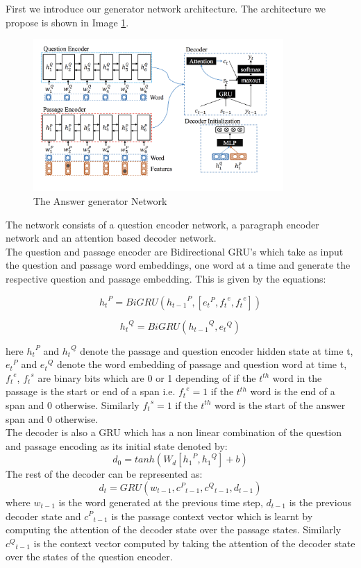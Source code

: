 First we introduce our generator network architecture. The architecture we propose is shown in Image \ref{im:im_gen}.
\begin{figure}[h]
    \centering
    \includegraphics[width=0.85\textwidth]{images/ans_net.png}
    \caption{The Answer generator Network}
    \label{im:im_gen}
\end{figure}

The network consists of a question encoder network, a paragraph encoder network and an attention based decoder network.\\
The question and passage encoder are Bidirectional GRU's which take as input the question and passage word embeddings, one word at a time and generate the respective question and passage embedding. This is given by the equations:

\[ {h_t}^P = BiGRU({h_{t-1}}^P, [{e_t}^P, {f_t}^e, {f_t}^e]) \]

\[{h_t}^Q = BiGRU({h_{t-1}}^Q, {e_t}^Q) \]

here ${h_t}^P$ and ${h_t}^Q$ denote the passage and question encoder hidden state at time t, ${e_t}^P$ and ${e_t}^Q$ denote the word embedding of  passage and question word at time t, ${f_t}^e$, ${f_t}^s$ are binary bits which are 0 or 1 depending of if the $t^{th}$ word in the passage is the start or end of a span i.e.  ${f_t}^e = 1$ if the $t^{th}$ word is the end of a span and 0 otherwise. Similarly ${f_t}^s = 1$ if the $t^{th}$ word is the start of the answer span and 0 otherwise.\\
The decoder is also a GRU which has a non linear combination of the question and passage encoding as its initial state denoted by:
\[ d_0 = tanh(W_d[{h_1}^P, {h_1}^Q] + b) \]
The rest of the decoder can be represented as:
\[d_t = GRU(w_{t-1}, {c^P}_{t-1}, {c^Q}_{t-1}, d_{t-1})\]
where $w_{t−1}$ is the word generated at the previous time step, $d_{t−1}$ is the previous decoder state and ${c^P}_{t-1}$ is the passage context vector which is learnt by computing the attention of the decoder state over the passage states. Similarly ${c^Q}_{t-1}$ is the context vector computed by taking the attention of the decoder state over the states of the question encoder. 

